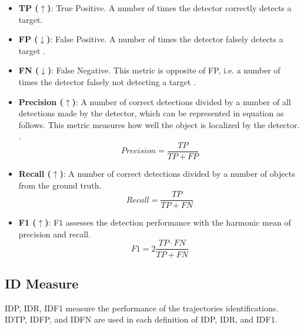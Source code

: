 \begin{itemize}

\item \textbf{TP ($\uparrow$)}: True Positive. A number of times the detector correctly detects a target. 

\item \textbf{FP ($\downarrow$)}: False Positive. A number of times the detector falsely detects a target \cite{ristani_performance_2016}.

\item \textbf{FN ($\downarrow$)}: False Negative. This metric is opposite of FP, i.e. a number of times the detector falsely not detecting a target \cite{ristani_performance_2016}.

\item \textbf{Precision ($\uparrow$)}: A number of correct detections divided by a number of all detections made by the detector, which can be represented in equation as follows. This metric measures how well the object is localized by the detector. \cite{ristani_performance_2016} \cite{milan_mot16_2016}.
\begin{equation}
Precision = \frac{TP}{TP + FP}
\label{eqn:Precision}
\end{equation}

\item \textbf{Recall ($\uparrow$)}: A number of correct detections divided by a number of objects from the ground truth.
\begin{equation}
Recall = \frac{TP}{TP + FN}
\label{eqn:Recall}
\end{equation}

\item \textbf{F1 ($\uparrow$)}: F1 assesses the detection performance with the harmonic mean of precision and recall.
\begin{equation}
F1 = 2\frac{TP \cdot FN}{TP + FN}
\label{eqn:F1}
\end{equation}

\end{itemize}




\subsection{ID Measure}
IDP, IDR, IDF1 measure the performance of the trajectories identifications. IDTP, IDFP, and IDFN are used in each definition of IDP, IDR, and IDF1.

